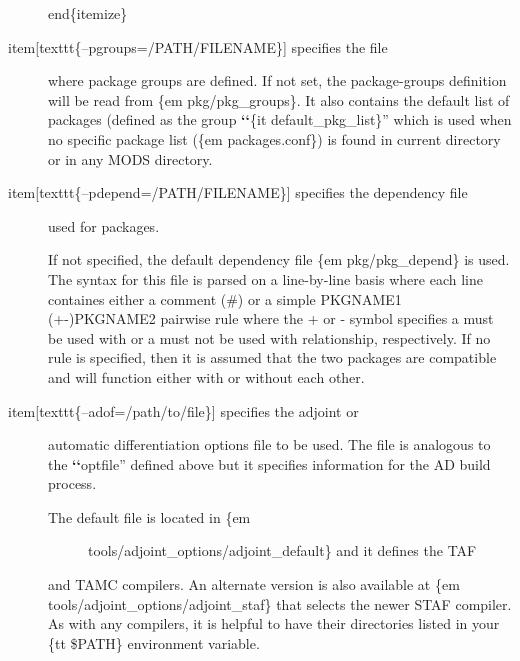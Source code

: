 \documentclass[letterpaper,10pt,english]{sphinxmanual}
\begin{document}
\begin{description}
end\{itemize\}

\item[{item{[}texttt\{--pgroups=/PATH/FILENAME\}{]} specifies the file}] \leavevmode
where package groups are defined. If not set, the package-groups
definition will be read from \{em pkg/pkg\_groups\}.
It also contains the default list of packages (defined
as the group {\color{red}\bfseries{}{}`{}`}\{it default\_pkg\_list\}'' which is used
when no specific package list (\{em packages.conf\})
is found in current directory or in any \sphinxquotedblleft{}MODS\sphinxquotedblright{} directory.

\item[{item{[}texttt\{--pdepend=/PATH/FILENAME\}{]} specifies the dependency file}] \leavevmode
used for packages.

If not specified, the default dependency file \{em pkg/pkg\_depend\}
is used.  The syntax for this file is parsed on a line-by-line basis
where each line containes either a comment (\sphinxquotedblleft{}\#\sphinxquotedblright{}) or a simple
\sphinxquotedblleft{}PKGNAME1 (+\textbar{}-)PKGNAME2\sphinxquotedblright{} pairwise rule where the \sphinxquotedblleft{}+\sphinxquotedblright{} or \sphinxquotedblleft{}-\sphinxquotedblright{} symbol
specifies a \sphinxquotedblleft{}must be used with\sphinxquotedblright{} or a \sphinxquotedblleft{}must not be used with\sphinxquotedblright{}
relationship, respectively.  If no rule is specified, then it is
assumed that the two packages are compatible and will function
either with or without each other.

\item[{item{[}texttt\{--adof=/path/to/file\}{]} specifies the \sphinxquotedblleft{}adjoint\sphinxquotedblright{} or}] \leavevmode
automatic differentiation options file to be used.  The file is
analogous to the {\color{red}\bfseries{}{}`{}`}optfile'' defined above but it specifies
information for the AD build process.
\begin{description}
\item[{The default file is located in \{em}] \leavevmode
tools/adjoint\_options/adjoint\_default\} and it defines the \sphinxquotedblleft{}TAF\sphinxquotedblright{}

\end{description}

and \sphinxquotedblleft{}TAMC\sphinxquotedblright{} compilers.  An alternate version is also available at
\{em tools/adjoint\_options/adjoint\_staf\} that selects the newer
\sphinxquotedblleft{}STAF\sphinxquotedblright{} compiler.  As with any compilers, it is helpful to have their
directories listed in your \{tt \$PATH\} environment variable.


\end{description}
\end{document}
